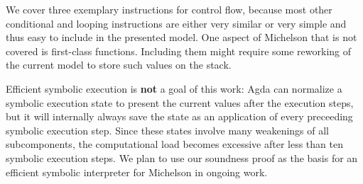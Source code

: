 We cover three exemplary instructions for control flow,
because most other conditional and looping instructions
are either very similar or very simple and thus easy to include in the presented model.
One aspect of Michelson that is not covered is first-class functions.
Including them might require some reworking of the current model to store such values on the stack.

Efficient symbolic execution is \textbf{not} a goal of this work:
Agda can normalize a symbolic execution state to present the current values after the execution 
steps, but it will internally always save the state as an application of every preceeding
symbolic execution step.
Since these states involve many weakenings of all subcomponents,
the computational load becomes excessive after
less than ten symbolic execution steps.
We plan to use our soundness proof as the basis for an efficient
symbolic interpreter for Michelson in ongoing work.


